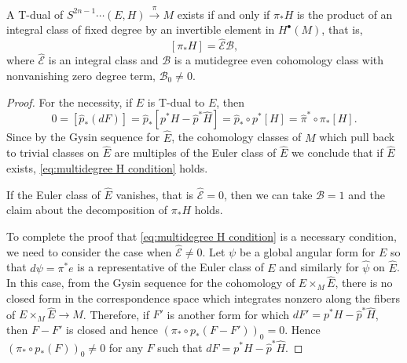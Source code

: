 \documentclass[10pt,a4paper]{amsart}
\newcommand{\mc}[1]{\text{$\mathcal{#1}$}}
\renewcommand{\to}{\longrightarrow}
\begin{document}
\begin{theorem}
A T-dual of $S^{2n-1}{\cdots} (E,H) \stackrel{\pi}{\longrightarrow} M$ exists if and only if $\pi_*H$ is the product of an integral class of fixed degree by an invertible element in $H^\bullet(M)$, that is,
\begin{equation}\label{eq:multidegree H condition}
[\pi_*H] = \hat{\mc{E}} \mc{B},
\end{equation}
where $\hat{\mc{E}}$ is an integral class and $\mc{B}$ is a mutidegree even cohomology class with nonvanishing zero degree term, $\mc{B}_0 \neq 0$.
\end{theorem}

\begin{proof}
For the necessity, if $\hat{E}$ is T-dual to $E$,  then
\begin{equation}\label{eq:restriction on H}
0 = [\hat{p}_*(dF)] = \hat{p}_*[p^*H - \hat{p}^*\hat{H}] =  \hat{p}_*\circ p^*[H] =   \hat{\pi}^*\circ \pi_*[H].
\end{equation}
Since by the Gysin sequence for $\hat{E}$, the cohomology classes of $M$ which pull back to trivial classes on $\hat{E}$ are multiples of the Euler class of $\hat{E}$ we conclude that if $\hat{E}$ exists,  \eqref{eq:multidegree H condition} holds.


If the Euler class of $\hat{E}$ vanishes, that is $\hat{\mc{E}} =0$, then we can take $\mc{B}=1$ and the claim about the decomposition of $\pi_*H$ holds.

To complete the proof that \eqref{eq:multidegree H condition} is a necessary condition, we need to consider the case when $\hat{\mc{E}} \neq 0$. Let $\psi$ be a global angular form for $E$ so that $d\psi = \pi^*e$ is a representative of the Euler class of $E$ and similarly for $\hat\psi$ on $\hat{E}$. In this case, from the Gysin sequence for the cohomology of $E\times_M \hat{E}$, there is no closed form in the correspondence space which integrates nonzero along the fibers of $E\times_M \hat{E} \to M$.
Therefore, if $F'$ is another form for which $dF' = p^*H -\hat{p}^*\hat{H}$, then $F-F'$ is closed and hence $(\pi_* \circ p_* (F-F'))_0 = 0$. Hence $(\pi_* \circ p_* (F))_0 \neq 0$ for any $F$ such that $dF =  p^*H -\hat{p}^*\hat{H}$. 


\end{proof}
\end{document}
